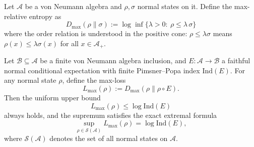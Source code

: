 \begin{definition}\label{def:op-algebra-max-relative-entropy}
Let \(\mathcal{A}\) be a von Neumann algebra and \(\rho,\sigma\) normal states on it.
Define the max-relative entropy as
\begin{equation}\label{eq:op-algebra-dmax-def}
\boxed{\;
D_{\max}(\rho\|\sigma)
:=\log\inf\{\lambda>0:\ \rho\le \lambda\,\sigma\}\;}
\end{equation}
where the order relation is understood in the positive cone: \(\rho\le \lambda\sigma\) means \(\rho(x)\le \lambda\sigma(x)\) for all \(x\in\mathcal{A}_+\).
\end{definition}

\begin{proposition}\label{prop:op-algebra-dmax-capacity-equals-log-index}
Let \(\mathcal{B}\subseteq\mathcal{A}\) be a finite von Neumann algebra inclusion,
and \(E:\mathcal{A}\to\mathcal{B}\) a faithful normal conditional expectation with finite Pimsner--Popa index \(\mathrm{Ind}(E)\).
For any normal state \(\rho\), define the max-loss
\[
L_{\max}(\rho):=D_{\max}(\rho\|\rho\!\circ\!E).
\]
Then the uniform upper bound
\begin{equation}\label{eq:op-algebra-dmax-bound-by-index}
\boxed{\;
L_{\max}(\rho)\le \log\mathrm{Ind}(E)\;}
\end{equation}
always holds, and the supremum satisfies the exact extremal formula
\begin{equation}\label{eq:op-algebra-dmax-sup-equals-log-index}
\boxed{\;
\sup_{\rho\in\mathcal{S}(\mathcal{A})}L_{\max}(\rho)=\log\mathrm{Ind}(E),\;}
\end{equation}
where \(\mathcal{S}(\mathcal{A})\) denotes the set of all normal states on \(\mathcal{A}\).
\end{proposition}
